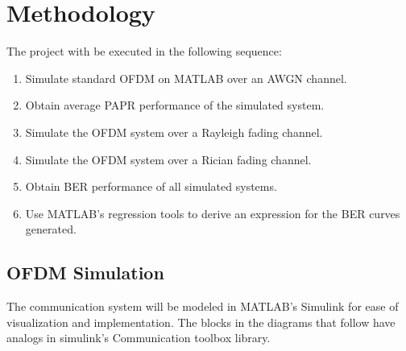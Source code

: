 
\chapter{Methodology}
The project with be executed in the following sequence:
\begin{enumerate}[label=\roman*.]
	\item Simulate standard \gls{OFDM} on MATLAB over an \gls{AWGN} channel.
	\item Obtain average \gls{PAPR} performance of the simulated system.
	\item Simulate the \gls{OFDM} system over a Rayleigh fading channel.
	\item Simulate the \gls{OFDM} system over a Rician fading channel.
	\item Obtain \gls{BER} performance of all simulated systems.
	\item Use MATLAB's regression tools to derive an expression for the \gls{BER} curves generated.
\end{enumerate}

\section{\gls{OFDM} Simulation}
The communication system will be modeled in MATLAB's Simulink for ease of visualization and implementation. The blocks in the diagrams that follow have analogs in \gls{simulink}'s Communication toolbox library.
